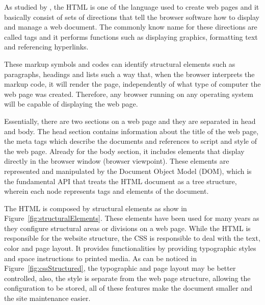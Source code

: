 As studied by \cite{FELKE-MORRIS:2019}, the \gls{HTML} is one of the language used to create web pages and it basically consist of sets of directions that tell the browser software how to display and manage a web document. The commonly know name for these directions are called tags and it performs functions such as displaying graphics, formatting text and referencing hyperlinks.

These markup symbols and codes can identify structural elements such as paragraphs, headings and lists such a way that, when the browser interprets the markup code, it will render the page, independently of what type of computer the web page was created. Therefore, any browser running on any operating system will be capable of displaying the web page.

Essentially, there are two sections on a web page and they are separated in head and body. The head section contains information about the title of the web page, the meta tags which describe the documents and references to script and style of the web page. Already for the body section, it includes elements that display directly in the browser window (browser viewpoint). These elements are represented and manipulated by the Document Object Model (DOM), which is the fundamental \gls{API} that treats the \gls{HTML} document as a tree structure, wherein each node represents tags and elements of the document.

The \gls{HTML} is composed by structural elements as show in Figure~\ref{fig:structuralElements}. These elements have been used for many years as they configure structural areas or divisions on a web page. While the \gls{HTML} is responsible for the website structure, the \gls{CSS} is responsible to deal with the text, color and page layout. It provides functionalities by providing typographic styles and space instructions to printed media. As can be noticed in Figure~\ref{fig:cssStructured}, the typographic and page layout may be better controlled, also, the style is separate from the web page structure, allowing the configuration to be stored, all of these features make the document smaller and the site maintenance easier.

